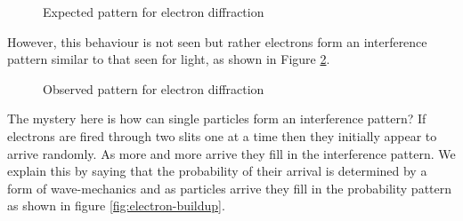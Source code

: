 \documentclass[revision-guide.tex]{subfiles}
\begin{document}
\begin{figure}[h]
  \begin{center}
  \end{center}
  \caption{Expected pattern for electron diffraction}
  \label{fig:electron-diff-expected}
\end{figure}


However, this behaviour is not seen but rather electrons form an interference pattern similar to that seen for light, as shown in Figure \ref{fig:electron-diff-observed}.

\begin{figure}[!h]
  \begin{center}
  \end{center}
  \caption{Observed pattern for electron diffraction}
  \label{fig:electron-diff-observed}
\end{figure}

The mystery here is how can single particles form an interference pattern? If electrons are fired through two slits one at a time then they initially appear to arrive randomly. As more and more arrive they fill in the interference pattern. We explain this by saying that the probability of their arrival is determined by a form of wave-mechanics and as particles arrive they fill in the probability pattern as shown in figure \ref{fig:electron-buildup}.
\end{document}

